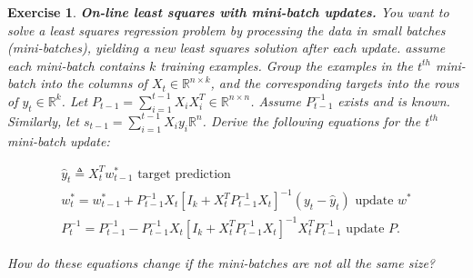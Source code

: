 \documentclass[12pt]{article}
\theoremstyle{colon}
\newtheorem{exercise}{Exercise}
\begin{document}
\clearpage

\begin{exercise}
  \textbf{On-line least squares with mini-batch updates.} You want to solve a least squares regression problem by processing the data in small batches (mini-batches), yielding a new least squares solution after each update. assume each mini-batch contains $k$ training examples. Group the examples in the $t^{th}$ mini-batch into the columns of $X_t \in \mathbb{R}^{n \times k}$, and the corresponding targets into the rows of $y_t \in \mathbb{R}^k$. Let $P_{t-1} = \sum_{i=1}^{t-1} X_i X_i^T \in \mathbb{R}^{n \times n}$. Assume $P_{t-1}^{-1}$ exists and is known. Similarly, let $s_{t-1} = \sum_{i=1}^{t-1} X_i y_i \mathbb{R}^n$. Derive the following equations for the $t^{th}$ mini-batch update:

  \begin{gather*}
    \hat{y}_t \triangleq X_t^T w_{t-1}^* \text{ target prediction} \\
    w_t^* = w_{t-1}^* + P_{t-1}^{-1} X_t [I_k + X_t^T P_{t-1}^{-1} X_t]^{-1} (y_t - \hat{y}_t) \text{ update } w^* \\
    P_t^{-1} = P_{t-1}^{-1} - P_{t-1}^{-1} X_t [I_k + X_t^T P_{t-1}^{-1} X_t]^{-1} X_t^T P_{t-1}^{-1} \text{ update } P.
  \end{gather*}

  How do these equations change if the mini-batches are not all the same size?
\end{exercise}
\end{document}
